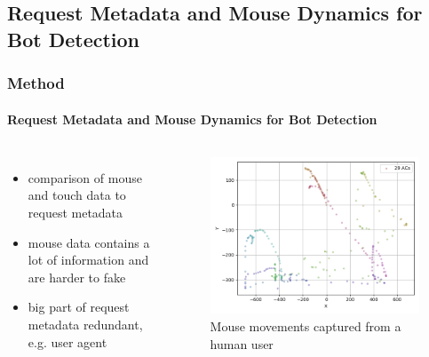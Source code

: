 \documentclass[t,aspectratio=169,table]{beamer}
\begin{document}
\subsection{Request Metadata and Mouse Dynamics for Bot Detection}
\begin{frame}
\frametitle{Method}
\framesubtitle{Request Metadata and Mouse Dynamics for Bot Detection}

\begin{columns}
\begin{itemize}
    \item comparison of mouse and touch data to request metadata
    \item mouse data contains a lot of information and are harder to fake
    \item big part of request metadata redundant, e.g. user agent
\end{itemize}

\begin{figure}
    \includegraphics[width=\textwidth]{figures/user_mouse_heatmap.png}
    \caption{Mouse movements captured from a human user}
\end{figure}

\end{columns}

\end{frame}
\end{document}
